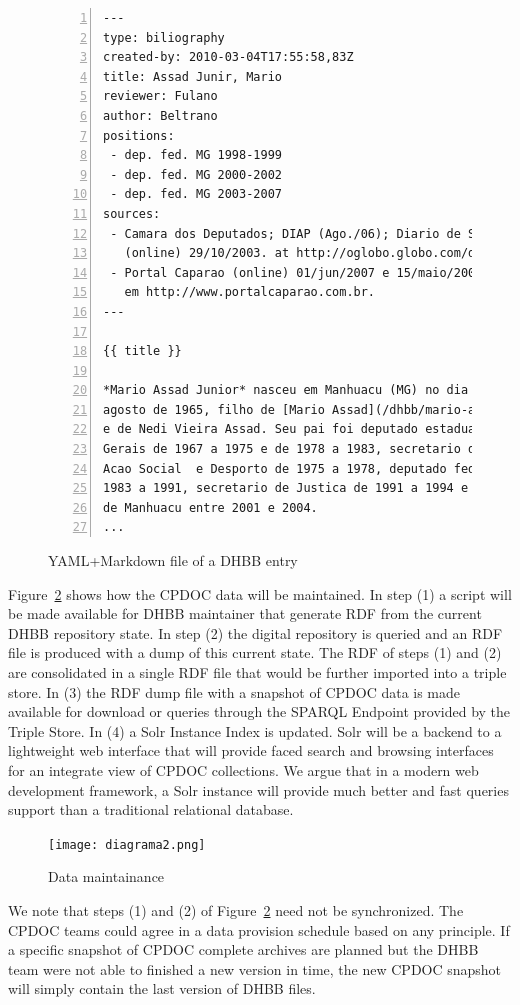 \documentclass{llncs}
\begin{document}
\begin{figure}[thbp]
  \centering
\begin{lstlisting}[frame=single,numbers=left,basicstyle=\footnotesize\ttfamily]
---
type: biliography
created-by: 2010-03-04T17:55:58,83Z
title: Assad Junir, Mario
reviewer: Fulano
author: Beltrano
positions: 
 - dep. fed. MG 1998-1999
 - dep. fed. MG 2000-2002
 - dep. fed. MG 2003-2007
sources: 
 - Camara dos Deputados; DIAP (Ago./06); Diario de Sao Paulo
   (online) 29/10/2003. at http://oglobo.globo.com/diariosp.
 - Portal Caparao (online) 01/jun/2007 e 15/maio/2008. Disp.
   em http://www.portalcaparao.com.br.
---

{{ title }}

*Mario Assad Junior* nasceu em Manhuacu (MG) no dia 11 de 
agosto de 1965, filho de [Mario Assad](/dhbb/mario-assad.html) 
e de Nedi Vieira Assad. Seu pai foi deputado estadual em Minas 
Gerais de 1967 a 1975 e de 1978 a 1983, secretario do Trabalho, 
Acao Social  e Desporto de 1975 a 1978, deputado federal de 
1983 a 1991, secretario de Justica de 1991 a 1994 e prefeito 
de Manhuacu entre 2001 e 2004.
...
\end{lstlisting}
\caption{YAML+Markdown file of a DHBB entry}\label{fig:dhbb-ex}
\end{figure}

Figure~\ref{fig:dia-2} shows how the CPDOC data will be maintained. In
step (1) a script will be made available for DHBB maintainer that
generate RDF from the current DHBB repository state. In step (2) the
digital repository is queried and an RDF file is produced with a dump
of this current state. The RDF of steps (1) and (2) are consolidated
in a single RDF file that would be further imported into a triple
store. In (3) the RDF dump file with a snapshot of CPDOC data is made
available for download or queries through the SPARQL Endpoint provided by
the Triple Store. In (4) a Solr Instance Index is updated. Solr will be a 
backend to a lightweight web interface that will provide faced search
and browsing interfaces for an integrate view of CPDOC collections. We argue that 
in a modern web development framework, a Solr instance will provide much better and fast 
queries support than a traditional relational database.

\begin{figure}[thbp]
  \centering
  \texttt{[image: diagrama2.png]}
  \caption{Data maintainance}\label{fig:dia-2}
\end{figure}

We note that steps (1) and (2) of Figure~\ref{fig:dia-2} need not be
synchronized. The CPDOC teams could agree in a data provision schedule
based on any principle. If a specific snapshot of CPDOC complete
archives are planned but the DHBB team were not able to finished a new
version in time, the new CPDOC snapshot will simply contain the last
version of DHBB files.
\end{document}
